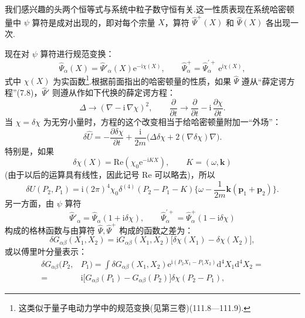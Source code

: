 我们感兴趣的头两个恒等式与系统中粒子数守恒有关.这一性质表现在系统哈密顿量中 $\psi$ 算符是成对出现的，即对每个宗量 $X$，算符 $\hat{\Psi}^{+}(X)$ 和 $\hat{\Psi}(X)$ 各出现一次.

现在对 $\psi$ 算符进行规范变换：
\begin{equation}
  \hat{\Psi}_{\alpha}(X)=\hat{\Psi}'_{\alpha}(X)\mathrm{e}^{-\mathrm{i}\chi(X)},\qquad
  \hat{\Psi}^{+}_{\alpha}=\hat{\Psi}^{\prime+}_{\alpha}\,\mathrm{e}^{\mathrm{i}\chi(X)},
\end{equation}
式中 $\chi(X)$ 为实函数\footnote{这类似于量子电动力学中的规范变换(见第三卷)(111.8—111.9).}.根据前面指出的哈密顿量的性质，如果 $\hat{\Psi}$ 遵从“薛定谔方程”(7.8)，$\hat{\Psi}'$ 则遵从作如下代换的薛定谔方程：
\begin{equation*}
  \Delta\to(\nabla-\mathrm{i}\,\nabla\chi)^2,\qquad
  \frac{\partial}{\partial t}\longrightarrow\frac{\partial}{\partial t}-\mathrm{i}\,\frac{\partial\chi}{\partial t}.
\end{equation*}
当 $\chi=\delta\chi$ 为无穷小量时，方程的这个改变相当于给哈密顿量附加一“外场”：
\begin{equation*}
  \delta\hat{U}=-\frac{\partial\delta\chi}{\partial t}+\frac{\mathrm{i}}{2m}\bigl(\Delta\delta\chi+2(\nabla\delta\chi)\nabla\bigr).
\end{equation*}
特别是，如果
\begin{equation*}
  \delta\chi(X)=\mathrm{Re}(\chi_0\mathrm{e}^{-\mathrm{i}KX}),\qquad K=(\omega,\bm{k})
\end{equation*}
(由于以后的运算具有线性，因此记号 Re 可以略去)，所以
\begin{equation}
  \delta U(P_2,P_1)=\mathrm{i}(2\pi)^4\chi_0\delta^{(4)}(P_2-P_1-K)\biggl\{\omega-\frac{1}{2m}\bm{k}(\bm{p}_1+\bm{p}_2)\biggr\}.
\end{equation}
另一方面，由 $\psi$ 算符
\begin{equation*}
  \hat{\Psi}'_{\alpha}=\hat{\Psi}_{\alpha}(1+\mathrm{i}\delta\chi),\qquad
  \hat{\Psi}^{\prime+}_{\alpha}=\hat{\Psi}^{+}_{\alpha}(1-\mathrm{i}\delta\chi)
\end{equation*}
构成的格林函数与由算符 $\hat{\Psi},\hat{\Psi}^{+}$ 构成的函数之差为：
\begin{equation*}
  \delta G_{\alpha\beta}(X_1,X_2)=\mathrm{i}G_{\alpha\beta}(X_1,X_2)\bigl[\delta\chi(X_1)-\delta\chi(X_2)\bigr],
\end{equation*}
或以傅里叶分量表示：
\begin{equation}
\begin{aligned}
  \delta G_{\alpha\beta}(P_2,&P_1)=\int\delta G_{\alpha\beta}(X_1,X_2)\mathrm{e}^{\mathrm{i}(P_2X_1-P_1X_2)}\mathrm{d}^4X_1\mathrm{d}^4X_2=\\
  ={}&\mathrm{i}\bigl[G_{\alpha\beta}(P_1)-G_{\alpha\beta}(P_2)\bigr]\delta\chi(P_2-P_1),
\end{aligned}
\end{equation}
